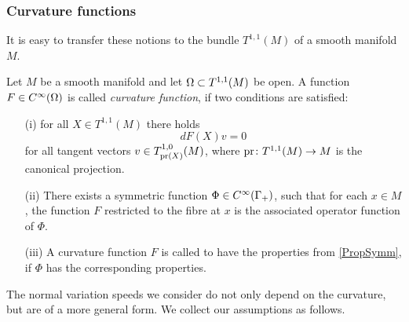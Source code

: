{}

\subsubsection*{Curvature functions}

It is easy to transfer these notions to the bundle $T^{1,1}(M)$ of a smooth manifold $M$.

\begin{defn}
Let $M$ be a smooth manifold and let $\Omega\subset T^{1,1}(M)$ be open. A function $F\in C^{\infty}(\Omega)$ is called {\it{curvature function}}, if two conditions are satisfied:
\begin{itemize}
\item[(i)] for all $X\in T^{1,1}(M)$ there holds
\[dF(X)v=0\]
for all tangent vectors $v\in T^{1,0}_{\operatorname{pr}(X)}(M)$, where $\operatorname{pr}\colon T^{1,1}(M)\rightarrow M$ is the canonical projection.

\item[(ii)] There exists a symmetric function $\Phi\in C^{\infty}(\Gamma_{+})$, such that for each $x\in M$, the function $F$ restricted to the fibre at $x$ is the associated operator function of $\Phi$.

\item[(iii)] A curvature function $F$ is called to have the properties from \cref{PropSymm}, if $\Phi$ has the corresponding properties.
\end{itemize}
\end{defn}





The normal variation speeds we consider do not only depend on the curvature, but are of a more general form. We collect our assumptions as follows.

